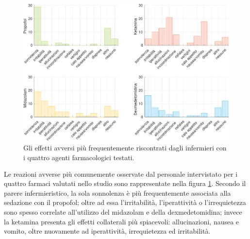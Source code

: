 \vfill


\begin{figure}[!h]
    \centering
    \includegraphics[width=1\textwidth]{Figure/effetti-avversi.pdf}
    \caption{Gli effetti avversi più frequentemente riscontrati dagli infermieri con i quattro agenti farmacologici testati.} %
    \label{fig:sicurezza}
\end{figure}

\vfill

Le reazioni avverse più comunemente osservate dal personale intervistato per i quattro farmaci valutati nello studio sono rappresentate nella figura \ref{fig:sicurezza}. Secondo il parere infermieristico, la sola sonnolenza è più frequentemente associata alla sedazione con il propofol; oltre ad essa l'irritabilità, l'iperattività o l'irrequietezza sono spesso correlate all'utilizzo del midazolam e della dexmedetomidina; invece la ketamina presenta gli effetti collaterali più spiacevoli: allucinazioni, nausea e vomito, oltre nuovamente ad iperattività, irrequietezza ed irritabilità.

